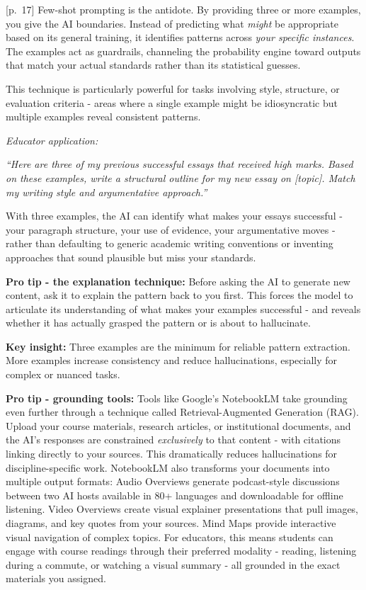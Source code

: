 \documentclass[
  letterpaper,
  DIV=11,
  numbers=noendperiod]{scrreprt}
\begin{document}
{[}p.~17{]} Few-shot prompting is the antidote. By providing three or
more examples, you give the AI boundaries. Instead of predicting what
\emph{might} be appropriate based on its general training, it identifies
patterns across \emph{your specific instances}. The examples act as
guardrails, channeling the probability engine toward outputs that match
your actual standards rather than its statistical guesses.

This technique is particularly powerful for tasks involving style,
structure, or evaluation criteria - areas where a single example might
be idiosyncratic but multiple examples reveal consistent patterns.

\emph{Educator application:}

\emph{``Here are three of my previous successful essays that received
high marks. Based on these examples, write a structural outline for my
new essay on {[}topic{]}. Match my writing style and argumentative
approach.''}

With three examples, the AI can identify what makes your essays
successful - your paragraph structure, your use of evidence, your
argumentative moves - rather than defaulting to generic academic writing
conventions or inventing approaches that sound plausible but miss your
standards.

\textbf{Pro tip - the explanation technique:} Before asking the AI to
generate new content, ask it to explain the pattern back to you first.
This forces the model to articulate its understanding of what makes your
examples successful - and reveals whether it has actually grasped the
pattern or is about to hallucinate.

\textbf{Key insight:} Three examples are the minimum for reliable
pattern extraction. More examples increase consistency and reduce
hallucinations, especially for complex or nuanced tasks.

\textbf{Pro tip - grounding tools:} Tools like Google's NotebookLM take
grounding even further through a technique called Retrieval-Augmented
Generation (RAG). Upload your course materials, research articles, or
institutional documents, and the AI's responses are constrained
\emph{exclusively} to that content - with citations linking directly to
your sources. This dramatically reduces hallucinations for
discipline-specific work. NotebookLM also transforms your documents into
multiple output formats: Audio Overviews generate podcast-style
discussions between two AI hosts available in 80+ languages and
downloadable for offline listening. Video Overviews create visual
explainer presentations that pull images, diagrams, and key quotes from
your sources. Mind Maps provide interactive visual navigation of complex
topics. For educators, this means students can engage with course
readings through their preferred modality - reading, listening during a
commute, or watching a visual summary - all grounded in the exact
materials you assigned.
\end{document}
